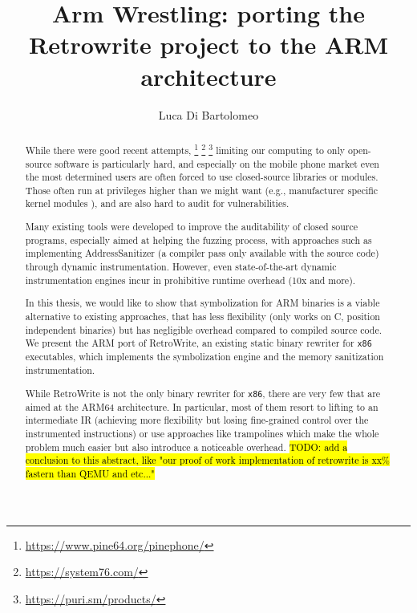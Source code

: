 \documentclass[a4paper,11pt,oneside]{report}
\title{Arm Wrestling: porting the Retrowrite project to the ARM architecture}
\author{Luca Di Bartolomeo} \adviser{Prof. Mathias Payer (EPFL)}
\newcommand{\sysname}{RetroWrite\xspace}
\newcommand{\todo}[1]{%
	\begingroup 
	\sethlcolor{cyan}%
	\hl{TODO: #1}%
	\endgroup
}
\begin{document}
\maketitle
\makededication
\makeacks


\begin{abstract}

	While there were good recent attempts, 
	\footnote{\url{https://www.pine64.org/pinephone/}}
	\footnote{\url{https://system76.com/}}
	\footnote{\url{https://puri.sm/products/}}
	limiting our computing to only open-source software
	is particularly hard, and especially on the mobile phone market even the
	most determined users are often forced to use closed-source libraries or
	modules.  Those often run at privileges higher than we might want (e.g.,
	manufacturer specific kernel modules \cite{androidclosed}), and are also
	hard to audit for vulnerabilities. 

	Many existing tools were developed to improve the auditability of closed
	source programs, especially aimed at helping the fuzzing process, with
	approaches such as implementing AddressSanitizer (a compiler pass only
	available with the source code) through dynamic instrumentation. However,  
	even state-of-the-art dynamic instrumentation engines incur in prohibitive 
	runtime overhead (10x and more). 

	In this thesis, we would like to show that symbolization for ARM binaries 
	is a viable alternative to existing approaches, that has less flexibility 
	(only works on C, position independent binaries) but has
	negligible overhead compared to compiled source code. We present the ARM
	port of \sysname, an existing static binary rewriter for \texttt{x86}
	executables, which implements the symbolization engine and the memory
	sanitization instrumentation. 

	While \sysname is not the only binary rewriter for \texttt{x86}, there are 
	very few that are aimed at the ARM64 architecture. In particular, most of 
	them resort to lifting to an intermediate IR (achieving more flexibility 
	but losing fine-grained control over the instrumented instructions) or use 
	approaches like trampolines which make the whole problem much easier but 
	also introduce a noticeable overhead.
	\todo{add a conclusion to this abstract, like "our proof of work 
	implementation of retrowrite is xx\% fastern than QEMU and etc..."}


\end{abstract}


\maketoc
\end{document}
